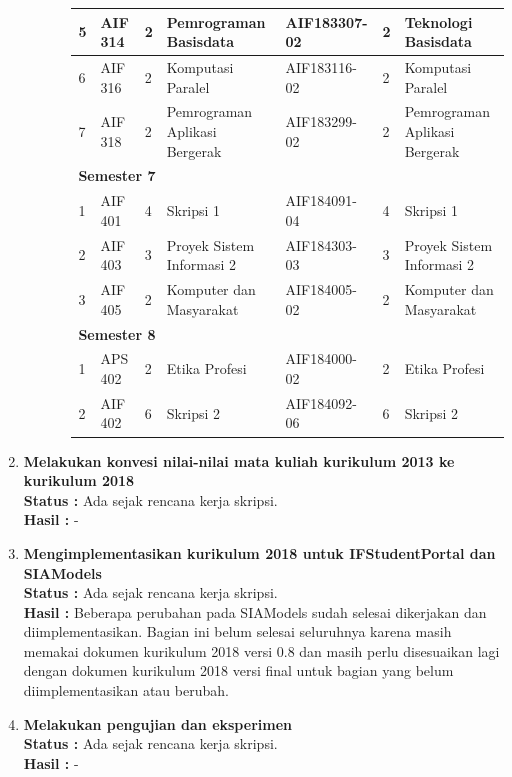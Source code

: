 \documentclass[a4paper,twoside]{article}
\begin{document}
\begin{enumerate}
\begin{enumerate}
\begin{itemize}
\begin{table}[H]
\begin{tabular}{|p{0.35cm}|p{2cm}|p{0.55cm}|p{3.45cm}|p{2.65cm}|p{0.55cm}|p{3.45cm}|}
						5 & AIF 314 & 2 & Pemrograman Basisdata & AIF183307-02 & 2 & Teknologi Basisdata \\ \hline
						6 & AIF 316 & 2 & Komputasi Paralel & AIF183116-02 & 2 & Komputasi Paralel \\ \hline
						7 & AIF 318 & 2 & Pemrograman Aplikasi Bergerak & AIF183299-02 & 2 & Pemrograman Aplikasi Bergerak \\ \hline
						\multicolumn{7}{|l|}{\textbf{Semester 7}} \\ \hline
						1 & AIF 401 & 4 & Skripsi 1 & AIF184091-04 & 4 & Skripsi 1 \\ \hline
						2 & AIF 403 & 3 & Proyek Sistem Informasi 2 & AIF184303-03 & 3 & Proyek Sistem Informasi 2 \\ \hline
						3 & AIF 405 & 2 & Komputer dan Masyarakat & AIF184005-02 & 2 & Komputer dan Masyarakat \\ \hline
						\multicolumn{7}{|l|}{\textbf{Semester 8}} \\ \hline
						1 & APS 402 & 2 & Etika Profesi & AIF184000-02 & 2 & Etika Profesi \\ \hline
						2 & AIF 402 & 6 & Skripsi 2 & AIF184092-06 & 6 & Skripsi 2 \\ \hline
						\end{tabular}
						\end{table}
				\end{itemize}
		\end{enumerate}

		\item \textbf{Melakukan konvesi nilai-nilai mata kuliah kurikulum 2013 ke kurikulum 2018}\\
		{\bf Status :} Ada sejak rencana kerja skripsi.\\
		{\bf Hasil :} -

		\item \textbf{Mengimplementasikan kurikulum 2018 untuk IFStudentPortal dan SIAModels}\\
		{\bf Status :} Ada sejak rencana kerja skripsi.\\
		{\bf Hasil :} Beberapa perubahan pada SIAModels sudah selesai dikerjakan dan diimplementasikan. Bagian ini belum selesai seluruhnya karena masih memakai dokumen kurikulum 2018 versi 0.8 dan masih perlu disesuaikan lagi dengan dokumen kurikulum 2018 versi final untuk bagian yang belum diimplementasikan atau berubah.

		\item \textbf{Melakukan pengujian dan eksperimen}\\
		{\bf Status :} Ada sejak rencana kerja skripsi.\\
		{\bf Hasil :} -


\end{enumerate}
\end{document}
